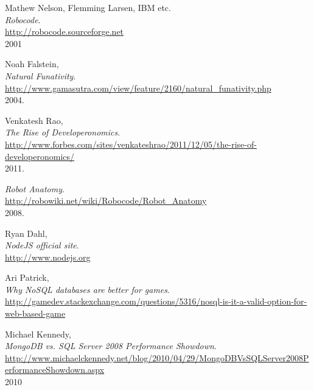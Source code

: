\documentclass[12pt]{article}
\begin{document}
\begin{thebibliography}{9}

	Mathew Nelson, Flemming Larsen, IBM etc.\\
	\emph{Robocode}.\\
	\url{http://robocode.sourceforge.net}\\
	2001

	Noah Falstein,\\
	\emph{Natural Funativity}.\\
	\url{http://www.gamasutra.com/view/feature/2160/natural\_funativity.php}\\
	2004.

	Venkatesh Rao,\\
	\emph{The Rise of Developeronomics}.\\
	\url{http://www.forbes.com/sites/venkateshrao/2011/12/05/the-rise-of-developeronomics/}\\
	2011.

	\emph{Robot Anatomy}. \\
	\url{http://robowiki.net/wiki/Robocode/Robot\_Anatomy}\\
	2008.

	Ryan Dahl,\\
	\emph{NodeJS official site}.\\
	\url{http://www.nodejs.org}

	Ari Patrick,\\
	\emph{Why NoSQL databases are better for games}.\\
	\url{http://gamedev.stackexchange.com/questions/5316/nosql-is-it-a-valid-option-for-web-based-game}

	Michael Kennedy,\\
	\emph{MongoDB vs. SQL Server 2008 Performance Showdown}.\\
	\url{http://www.michaelckennedy.net/blog/2010/04/29/MongoDBVsSQLServer2008PerformanceShowdown.aspx}\\
	2010

\end{thebibliography}

	
\end{document}
